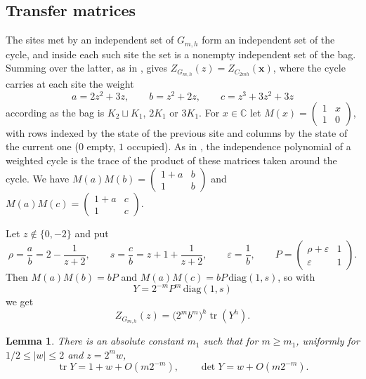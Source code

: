 \documentclass[11pt]{article}
\newtheorem{lemma}[theorem]{Lemma}
\theoremstyle{remark}
\newcommand{\tr}{\operatorname{tr}}
\begin{document}
\subsection{Transfer matrices}

The sites met by an independent set of $G_{m,h}$ form an independent set of the cycle, and inside each such site
the set is a nonempty independent set of the bag. Summing over the latter, as in \cite[Section~5.4]{JP}, gives
$Z_{G_{m,h}}(z)=Z_{C_{2mh}}(\boldsymbol x)$, where the cycle carries at each site the weight
\[
a=2z^2+3z,\qquad b=z^2+2z,\qquad c=z^3+3z^2+3z
\]
according as the bag is $K_2\sqcup K_1$, $2K_1$ or $3K_1$. For $x\in\mathbb C$ let
$M(x)=\begin{pmatrix}1&x\\1&0\end{pmatrix}$, with rows indexed by the state of the previous site and columns by the
state of the current one ($0$ empty, $1$ occupied). As in \cite[Section~5.1]{JP}, the independence polynomial of a
weighted cycle is the trace of the product of these matrices taken around the cycle. We have
$M(a)M(b)=\begin{pmatrix}1+a&b\\1&b\end{pmatrix}$ and $M(a)M(c)=\begin{pmatrix}1+a&c\\1&c\end{pmatrix}$.

Let $z\notin\{0,-2\}$ and put
\[
\rho=\frac ab=2-\frac1{z+2},\qquad s=\frac cb=z+1+\frac1{z+2},\qquad\varepsilon=\frac1b,\qquad
P=\begin{pmatrix}\rho+\varepsilon&1\\\varepsilon&1\end{pmatrix}.
\]
Then $M(a)M(b)=bP$ and $M(a)M(c)=bP\,\mathrm{diag}(1,s)$, so with
\[
Y=2^{-m}P^m\,\mathrm{diag}(1,s)
\]
we get
\begin{equation}\label{eq:trace}
Z_{G_{m,h}}(z)=\bigl(2^mb^m\bigr)^h\tr(Y^h).
\end{equation}

\begin{lemma}\label{lem:asym}
There is an absolute constant $m_1$ such that for $m\ge m_1$, uniformly for $1/2\le|w|\le2$ and $z=2^mw$,
\[
\tr Y=1+w+O(m2^{-m}),\qquad\det Y=w+O(m2^{-m}).
\]
\end{lemma}
\end{document}
